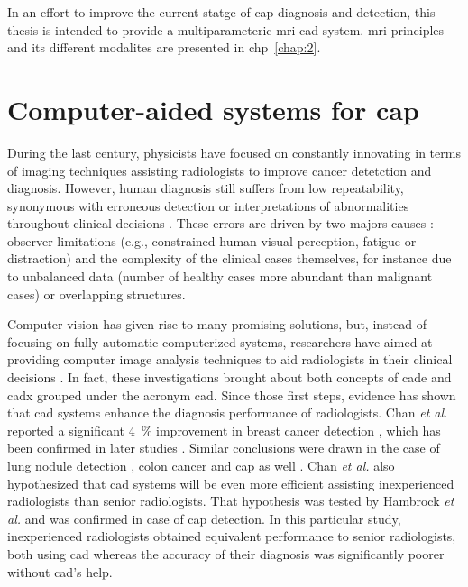 In an effort to improve the current statge of \ac{cap} diagnosis and detection, this thesis is intended to provide a multiparameteric \ac{mri} \acs{cad} system. 
\ac{mri} principles and its different modalites are presented in \ac{chp}~\ref{chap:2}. 

\section{Computer-aided systems for \ac{cap}}\label{sec:intro:cad} 
During the last century, physicists have focused on constantly innovating in terms of imaging techniques assisting radiologists to improve cancer detetction and diagnosis.
However, human diagnosis still suffers from low repeatability, synonymous with erroneous detection or interpretations of abnormalities throughout clinical decisions \cite{Giger2008,Hambrock2013}.
These errors are driven by two majors causes \cite{Giger2008}: observer limitations (e.g., constrained human visual perception, fatigue or distraction) and the complexity of the clinical cases themselves, for instance due to unbalanced data (number of healthy cases more abundant than malignant cases) or overlapping structures.

Computer vision has given rise to many promising solutions, but, instead of focusing on fully automatic computerized systems, researchers have aimed at providing computer image analysis techniques to aid radiologists in their clinical decisions \cite{Giger2008}.
In fact, these investigations brought about both concepts of \ac{cade} and \ac{cadx} grouped under the acronym \acs{cad}.
Since those first steps, evidence has shown that \acs{cad} systems enhance the diagnosis performance of radiologists.
Chan \textit{et al.} reported a significant 4~\% improvement in breast cancer detection \cite{Chan1999}, which has been confirmed in later studies \cite{Dean2006}.
Similar conclusions were drawn in the case of lung nodule detection \cite{Li2004}, colon cancer \cite{Petrick2008} and \ac{cap} as well \cite{Hambrock2013}.
Chan \textit{et al.} \cite{Chan1999} also hypothesized that \acs{cad} systems will be even more efficient assisting inexperienced radiologists than senior radiologists.
That hypothesis was tested by Hambrock \textit{et al.} \cite{Hambrock2013} and was confirmed in case of \ac{cap} detection.
In this particular study, inexperienced radiologists obtained equivalent performance to senior radiologists, both using \acs{cad} whereas the accuracy of their diagnosis was significantly poorer without \ac{cad}'s help.

